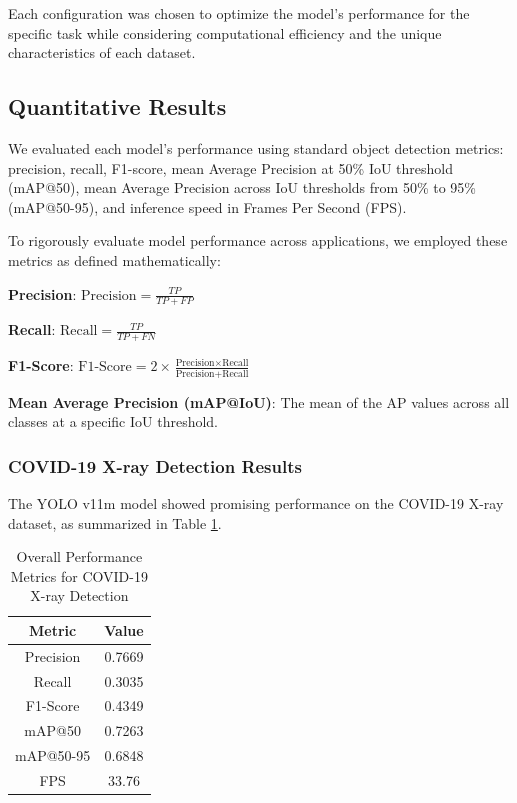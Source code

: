 \begin{multicols}{2}
Each configuration was chosen to optimize the model's performance for the specific task while considering computational efficiency and the unique characteristics of each dataset.

\subsection{Quantitative Results}

We evaluated each model's performance using standard object detection metrics: precision, recall, F1-score, mean Average Precision at 50\% IoU threshold (mAP@50), mean Average Precision across IoU thresholds from 50\% to 95\% (mAP@50-95), and inference speed in Frames Per Second (FPS).

To rigorously evaluate model performance across applications, we employed these metrics as defined mathematically:

\textbf{Precision}: $\text{Precision} = \frac{TP}{TP + FP}$

\textbf{Recall}: $\text{Recall} = \frac{TP}{TP + FN}$

\textbf{F1-Score}: $\text{F1-Score} = 2 \times \frac{\text{Precision} \times \text{Recall}}{\text{Precision} + \text{Recall}}$

\textbf{Mean Average Precision (mAP@IoU)}: The mean of the AP values across all classes at a specific IoU threshold.

\subsubsection{COVID-19 X-ray Detection Results}

The YOLO v11m model showed promising performance on the COVID-19 X-ray dataset, as summarized in Table \ref{tab:covid_results}.

\begin{table}[h]
\centering
\begin{tabular}{|c|c|}
\hline
\textbf{Metric} & \textbf{Value} \\
\hline
Precision & 0.7669 \\
Recall & 0.3035 \\
F1-Score & 0.4349 \\
mAP@50 & 0.7263 \\
mAP@50-95 & 0.6848 \\
FPS & 33.76 \\
\hline
\end{tabular}
\caption{Overall Performance Metrics for COVID-19 X-ray Detection}
\label{tab:covid_results}
\end{table}


\end{multicols}
